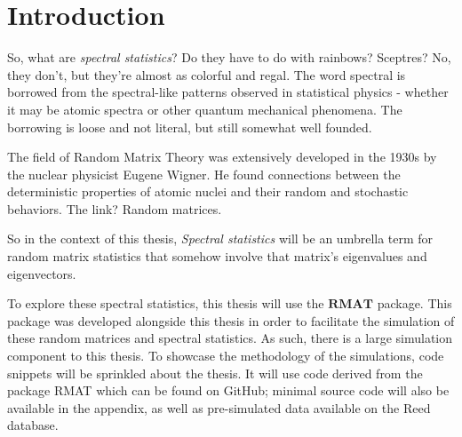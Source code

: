 
  \chapter*{Introduction}
	

So, what are \textit{spectral statistics}? Do they have to do with rainbows? Sceptres? No, they don’t, but they’re almost as colorful and regal. The word spectral is borrowed from the spectral-like patterns observed in statistical physics - whether it may be atomic spectra or other quantum mechanical phenomena. The borrowing is loose and not literal, but still somewhat well founded. 

The field of Random Matrix Theory was extensively developed in the 1930s by the nuclear physicist Eugene Wigner. He found connections between the deterministic properties of atomic nuclei and their random and stochastic behaviors. The link? Random matrices.

So in the context of this thesis, \textit{Spectral statistics} will be an umbrella term for random matrix statistics that somehow involve that matrix's eigenvalues and eigenvectors.

To explore these spectral statistics, this thesis will use the $\textbf{RMAT}$ package. This package was developed alongside this thesis in order to facilitate the simulation of these random matrices and spectral statistics. As such, there is a large simulation component to this thesis. To showcase the methodology of the simulations, code snippets will be sprinkled about the thesis. It will use code derived from the package RMAT which can be found on GitHub; minimal source code will also be available in the appendix, as well as pre-simulated data available on the Reed database.





